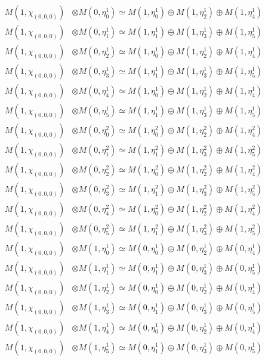 \begin{align*}
M(1,\chi_{(0,0,0)}) &\otimes M(0,\eta^{1}_{0}) \simeq M(1,\eta^{1}_{0}) \oplus M(1,\eta^{1}_{2}) \oplus M(1,\eta^{1}_{4}) \\
M(1,\chi_{(0,0,0)}) &\otimes M(0,\eta^{1}_{1}) \simeq M(1,\eta^{1}_{1}) \oplus M(1,\eta^{1}_{3}) \oplus M(1,\eta^{1}_{5}) \\
M(1,\chi_{(0,0,0)}) &\otimes M(0,\eta^{1}_{2}) \simeq M(1,\eta^{1}_{0}) \oplus M(1,\eta^{1}_{2}) \oplus M(1,\eta^{1}_{4}) \\
M(1,\chi_{(0,0,0)}) &\otimes M(0,\eta^{1}_{3}) \simeq M(1,\eta^{1}_{1}) \oplus M(1,\eta^{1}_{3}) \oplus M(1,\eta^{1}_{5}) \\
M(1,\chi_{(0,0,0)}) &\otimes M(0,\eta^{1}_{4}) \simeq M(1,\eta^{1}_{0}) \oplus M(1,\eta^{1}_{2}) \oplus M(1,\eta^{1}_{4}) \\
M(1,\chi_{(0,0,0)}) &\otimes M(0,\eta^{1}_{5}) \simeq M(1,\eta^{1}_{1}) \oplus M(1,\eta^{1}_{3}) \oplus M(1,\eta^{1}_{5}) \\
M(1,\chi_{(0,0,0)}) &\otimes M(0,\eta^{2}_{0}) \simeq M(1,\eta^{2}_{0}) \oplus M(1,\eta^{2}_{2}) \oplus M(1,\eta^{2}_{4}) \\
M(1,\chi_{(0,0,0)}) &\otimes M(0,\eta^{2}_{1}) \simeq M(1,\eta^{2}_{1}) \oplus M(1,\eta^{2}_{3}) \oplus M(1,\eta^{2}_{5}) \\
M(1,\chi_{(0,0,0)}) &\otimes M(0,\eta^{2}_{2}) \simeq M(1,\eta^{2}_{0}) \oplus M(1,\eta^{2}_{2}) \oplus M(1,\eta^{2}_{4}) \\
M(1,\chi_{(0,0,0)}) &\otimes M(0,\eta^{2}_{3}) \simeq M(1,\eta^{2}_{1}) \oplus M(1,\eta^{2}_{3}) \oplus M(1,\eta^{2}_{5}) \\
M(1,\chi_{(0,0,0)}) &\otimes M(0,\eta^{2}_{4}) \simeq M(1,\eta^{2}_{0}) \oplus M(1,\eta^{2}_{2}) \oplus M(1,\eta^{2}_{4}) \\
M(1,\chi_{(0,0,0)}) &\otimes M(0,\eta^{2}_{5}) \simeq M(1,\eta^{2}_{1}) \oplus M(1,\eta^{2}_{3}) \oplus M(1,\eta^{2}_{5}) \\
M(1,\chi_{(0,0,0)}) &\otimes M(1,\eta^{1}_{0}) \simeq M(0,\eta^{1}_{0}) \oplus M(0,\eta^{1}_{2}) \oplus M(0,\eta^{1}_{4}) \\
M(1,\chi_{(0,0,0)}) &\otimes M(1,\eta^{1}_{1}) \simeq M(0,\eta^{1}_{1}) \oplus M(0,\eta^{1}_{3}) \oplus M(0,\eta^{1}_{5}) \\
M(1,\chi_{(0,0,0)}) &\otimes M(1,\eta^{1}_{2}) \simeq M(0,\eta^{1}_{0}) \oplus M(0,\eta^{1}_{2}) \oplus M(0,\eta^{1}_{4}) \\
M(1,\chi_{(0,0,0)}) &\otimes M(1,\eta^{1}_{3}) \simeq M(0,\eta^{1}_{1}) \oplus M(0,\eta^{1}_{3}) \oplus M(0,\eta^{1}_{5}) \\
M(1,\chi_{(0,0,0)}) &\otimes M(1,\eta^{1}_{4}) \simeq M(0,\eta^{1}_{0}) \oplus M(0,\eta^{1}_{2}) \oplus M(0,\eta^{1}_{4}) \\
M(1,\chi_{(0,0,0)}) &\otimes M(1,\eta^{1}_{5}) \simeq M(0,\eta^{1}_{1}) \oplus M(0,\eta^{1}_{3}) \oplus M(0,\eta^{1}_{5}) \\
\end{align*}

